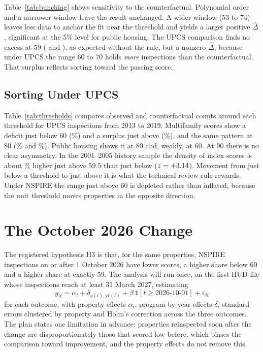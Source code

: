 \documentclass[10pt,twocolumn,letterpaper]{article}
\newcommand{\tabnote}[1]{\par\vspace{0.4ex}{\scriptsize\raggedright #1\par}}
\begin{document}
Table~\ref{tab:bunching} shows sensitivity to the counterfactual. Polynomial order and a narrower window leave the result unchanged. A wider window (53 to 74) leaves less data to anchor the fit near the threshold and yields a larger positive $\hat\Delta$, significant at the 5\% level for public housing. The UPCS comparison finds no excess at 59 (\upcsExcMf{} and \upcsExcPh), as expected without the rule, but a nonzero $\hat\Delta$, because under UPCS the range 60 to 70 holds \emph{more} inspections than the counterfactual. That surplus reflects sorting toward the passing score.

\subsection{Sorting Under UPCS}
Table~\ref{tab:thresholds} compares observed and counterfactual counts around each threshold for UPCS inspections from 2013 to 2019. Multifamily scores show a deficit just below 60 (\thrMfSixtyBelow\%) and a surplus just above (\thrMfSixtyAbove\%), and the same pattern at 80 (\thrMfEightyBelow\% and \thrMfEightyAbove\%). Public housing shows it at 80 and, weakly, at 60. At 90 there is no clear asymmetry. In the 2001--2005 history sample the density of index scores is about \histDensPct\% higher just above 59.5 than just below ($z=+3.14$). Movement from just below a threshold to just above it is what the technical-review rule rewards. Under NSPIRE the range just above 60 is depleted rather than inflated, because the unit threshold moves properties in the opposite direction.

\begin{table}[t]
\caption{Observed and counterfactual counts around thresholds, UPCS 2013--2019}\label{tab:thresholds}
\centering\footnotesize

\tabnote{\centering Counterfactual from a quadratic fitted to integer scores $c-10$ to $c+9$ excluding $c-2$ to $c+1$. Registered as descriptive; no standard errors were pre-specified.}
\end{table}

\section{The October 2026 Change}\label{sec:h3}
The registered hypothesis H3 is that, for the same properties, NSPIRE inspections on or after 1 October 2026 have lower scores, a higher share below 60 and a higher share at exactly 59. The analysis will run once, on the first HUD file whose inspections reach at least 31 March 2027, estimating
\begin{equation}
y_{it}=\alpha_i+\delta_{g(i),\text{yr}(t)}+\beta\,\mathbb 1[t\ge\text{2026-10-01}]+\varepsilon_{it}
\end{equation}
for each outcome, with property effects $\alpha_i$, program-by-year effects $\delta$, standard errors clustered by property and Holm's correction across the three outcomes. The plan states one limitation in advance: properties reinspected soon after the change are disproportionately those that scored low before, which biases the comparison toward improvement, and the property effects do not remove this.
\end{document}
